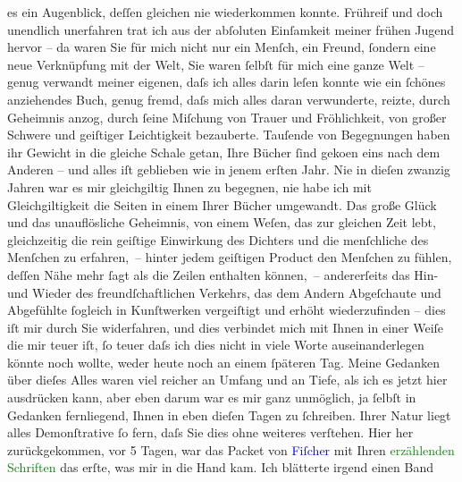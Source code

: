                es ein Augenblick, deſſen {\pb}gleichen nie wiederkommen
               konnte. Frühreif und doch unendlich unerfahren trat ich aus der abſoluten Einſamkeit
               meiner frühen Jugend hervor – da waren Sie für mich nicht nur ein Menſch, ein Freund,
               ſondern eine neue Verknüpfung mit der Welt, Sie waren ſelbſt für mich eine ganze Welt
               –  genug verwandt meiner eigenen, daſs ich alles
               darin leſen konnte wie ein ſchönes anziehendes Buch, genug fremd, daſs mich alles
               daran verwunderte, reizte, durch Geheimnis anzog, durch ſeine Miſchung von Trauer und
               Fröhlichkeit, von großer Schwere und geiſtiger Leichtigkeit bezauberte. Tauſende von
               Begegnungen haben ihr Gewicht in die gleiche Schale getan, Ihre Bücher ſind geko{\geminationm}en eins nach dem Anderen – und alles iſt geblieben wie
               in jenem erſten Jahr. Nie in dieſen zwanzig Jahren war es mir gleichgiltig Ihnen zu
               begegnen, nie habe ich mit Gleichgiltigkeit die Seiten in einem Ihrer Bücher
               umgewandt.\pend
           \pstart
           {\pb}Das große Glück und das unauflösliche Geheimnis, von
               einem Weſen, das zur gleichen Zeit lebt, gleichzeitig die rein geiſtige Einwirkung
               des Dichters und die menſchliche des Menſchen zu erfahren, – hinter jedem geiſtigen
               Product den Menſchen zu fühlen, deſſen Nähe mehr ſagt als die Zeilen enthalten
               können, – andererſeits das Hin- und Wieder des freundſchaftlichen Verkehrs, das dem
               Andern Abgeſchaute und Abgefühlte ſogleich in Kunſtwerken vergeiſtigt und erhöht
               wiederzufinden – dies iſt mir durch Sie widerfahren, und dies verbindet mich mit
               Ihnen in einer Weiſe die mir teuer iſt, ſo teuer daſs ich dies nicht in viele Worte
               auseinanderlegen könnte noch wollte, weder heute noch an einem ſpäteren Tag.\pend
           \pstart
           Meine Gedanken über dieſes Alles waren viel reicher an Umfang und an Tiefe, als ich
               es jetzt hier ausdrücken kann, aber eben darum war es mir ganz {\pb}unmöglich, ja ſelbſt in Gedanken fernliegend, Ihnen in
               eben dieſen Tagen zu ſchreiben. Ihrer Natur liegt alles Demonſtrative ſo fern, daſs
               Sie dies ohne weiteres verſtehen.\pend
           \pstart
           Hier her zurückgekommen, vor 5 Tagen, war das Packet von \textcolor{blue}{Fiſcher}{}\ledrightnote{\textcolor{blue}{Samuel Fischer}} mit Ihren \textcolor{green}{erzählenden
                  Schriften}{}\ledrightnote{\textcolor{green}{Erzählende Schriften}} das erſte, was mir in die Hand kam. Ich blätterte irgend einen Band
